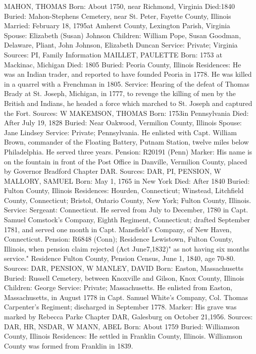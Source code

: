 MAHON, THOMAS 
Born: About 1750, near Richmond, Virginia
Died:1840
Buried: Mahon-Stephens Cemetery, near St. Peter, Fayette County, Illinois 
Married: February 18, 1795at Amherst County, Lexington Parish, Virginia
Spouse: Elizabeth (Susan) Johnson
Children: William Pope, Susan Goodman, Delaware, Pliant, John Johnson, Elizabeth Duncan
Service: Private; Virginia
Sources: PI, Family Information 
MAILLET, PAULETTE 
Born: 1753 at Mackinac, Michigan 
Died: 1805 
Buried: Peoria County, Illinois 
Residences: He was an Indian trader, and reported to have founded Peoria in 1778. He was killed in a quarrel with a Frenchman in 1805. 
Service: Hearing of the defeat of Thomas Brady at St. Joseph, Michigan, in 1777, to revenge the killing of men by the British and Indians, he headed a force which marched to St. Joseph and captured the Fort. 
Sources: W 
MAKEMSON, THOMAS 
Born: 1753in Pennsylvania
Died: After July 19, 1828
Buried: Near Oakwood, Vermilion County, Illinois
Spouse: Jane Lindsey
Service: Private; Pennsylvania. He enlisted with Capt. William Brown, commander of the Floating Battery, Putnam Station, twelve miles below Philadelphia. He served three years.
Pension: R20191 (Penn)
Marker: His name is on the fountain in front of the Post Office in Danville, Vermilion County, placed by Governor Bradford Chapter DAR.
Sources: DAR, PI, PENSION, W 
MALLORY, SAMUEL
Born: May 1, 1765 in New York
Died: After 1840
Buried: Fulton County, Illinois
Residences: Hourden, Connecticut; Winstead, Litchfield County, Connecticut; Bristol, Ontario County, New York; Fulton County, Illinois.
Service: Sergeant: Connecticut. He served from July to December, 1780 in Capt. Samuel Comstock's Company, Eighth Regiment, Connecticut; drafted Septem­ber 1781, and served one month in Capt. Mansfield's Company, of New Haven, Connecticut.
Pension: R6848 (Conn); Residence Lewistown, Fulton County, Illinois, when pension claim rejected (Act June7,1832)" as not having six months service." Residence Fulton County, Pension Census, June 1, 1840, age 70-80.
Sources: DAR, PENSION, W 
MANLEY, DAVID
Born: Easton, Massachusetts
Buried: Russell Cemetery, between Knoxville and Gilson, Knox County, Illinois
Children: George
Service: Private; Massachusetts. He enlisted from Easton, Massachusetts, in August 1778 in Capt. Samuel White's Company, Col. Thomas Carpenter's Regiment; discharged in September 1778. 
Marker: His grave was marked by Rebecca Parke Chapter DAR, Galesburg on October 21,1956.
Sources: DAR, HR, NSDAR, W 
MANN, ABEL 
Born: About 1759
Buried: Williamson County, Illinois
Residences: He settled in Franklin County, Illinois. Williamson County was formed from Franklin in 1839.
